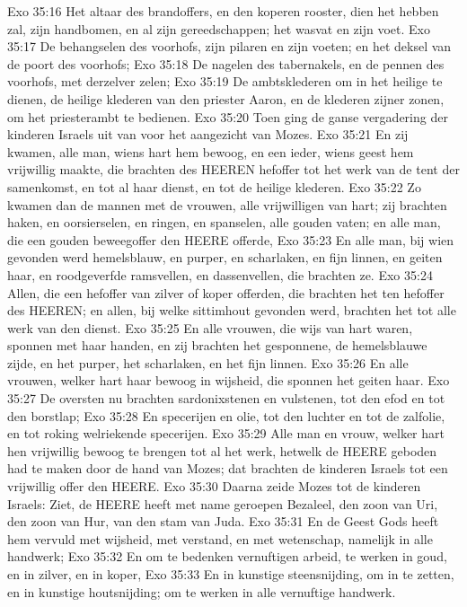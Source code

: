 Exo 35:16  Het altaar des brandoffers, en den koperen rooster, dien het hebben zal, zijn handbomen, en al zijn gereedschappen; het wasvat en zijn voet.
Exo 35:17  De behangselen des voorhofs, zijn pilaren en zijn voeten; en het deksel van de poort des voorhofs;
Exo 35:18  De nagelen des tabernakels, en de pennen des voorhofs, met derzelver zelen;
Exo 35:19  De ambtsklederen om in het heilige te dienen, de heilige klederen van den priester Aaron, en de klederen zijner zonen, om het priesterambt te bedienen.
Exo 35:20  Toen ging de ganse vergadering der kinderen Israels uit van voor het aangezicht van Mozes.
Exo 35:21  En zij kwamen, alle man, wiens hart hem bewoog, en een ieder, wiens geest hem vrijwillig maakte, die brachten des HEEREN hefoffer tot het werk van de tent der samenkomst, en tot al haar dienst, en tot de heilige klederen.
Exo 35:22  Zo kwamen dan de mannen met de vrouwen, alle vrijwilligen van hart; zij brachten haken, en oorsierselen, en ringen, en spanselen, alle gouden vaten; en alle man, die een gouden beweegoffer den HEERE offerde,
Exo 35:23  En alle man, bij wien gevonden werd hemelsblauw, en purper, en scharlaken, en fijn linnen, en geiten haar, en roodgeverfde ramsvellen, en dassenvellen, die brachten ze.
Exo 35:24  Allen, die een hefoffer van zilver of koper offerden, die brachten het ten hefoffer des HEEREN; en allen, bij welke sittimhout gevonden werd, brachten het tot alle werk van den dienst.
Exo 35:25  En alle vrouwen, die wijs van hart waren, sponnen met haar handen, en zij brachten het gesponnene, de hemelsblauwe zijde, en het purper, het scharlaken, en het fijn linnen.
Exo 35:26  En alle vrouwen, welker hart haar bewoog in wijsheid, die sponnen het geiten haar.
Exo 35:27  De oversten nu brachten sardonixstenen en vulstenen, tot den efod en tot den borstlap;
Exo 35:28  En specerijen en olie, tot den luchter en tot de zalfolie, en tot roking welriekende specerijen.
Exo 35:29  Alle man en vrouw, welker hart hen vrijwillig bewoog te brengen tot al het werk, hetwelk de HEERE geboden had te maken door de hand van Mozes; dat brachten de kinderen Israels tot een vrijwillig offer den HEERE.
Exo 35:30  Daarna zeide Mozes tot de kinderen Israels: Ziet, de HEERE heeft met name geroepen Bezaleel, den zoon van Uri, den zoon van Hur, van den stam van Juda.
Exo 35:31  En de Geest Gods heeft hem vervuld met wijsheid, met verstand, en met wetenschap, namelijk in alle handwerk;
Exo 35:32  En om te bedenken vernuftigen arbeid, te werken in goud, en in zilver, en in koper,
Exo 35:33  En in kunstige steensnijding, om in te zetten, en in kunstige houtsnijding; om te werken in alle vernuftige handwerk.
